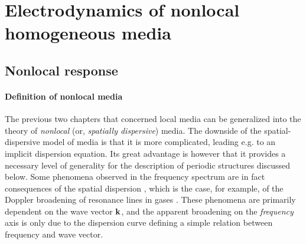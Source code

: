 
\section{Electrodynamics of nonlocal homogeneous media} 
\subsection{Nonlocal response} 
\paragraph{Definition of nonlocal media}%
The previous two chapters that concerned local media can be generalized into the theory of \textit{nonlocal} (or, \textit{spatially dispersive}) media.  The downside of the spatial-dispersive model of media is that it is more complicated, leading e.g. to an implicit dispersion equation. Its great advantage is however that it provides a necessary level of generality for the description of periodic structures discussed below. 
Some phenomena observed in the frequency spectrum are in fact consequences of the spatial dispersion \cite[p. 359]{landau1984electrodynamics}, which is the case, for example, of the Doppler broadening of resonance lines in gases \cite{makarov2004permittivity}. 
These phenomena are primarily dependent on the wave vector ${\mathbf{k}}$, and the apparent broadening on the \textit{frequency} axis is only due to the dispersion curve defining a simple relation between  frequency and wave vector.  

